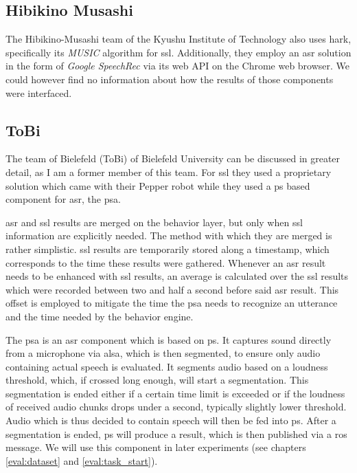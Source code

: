 \subsection{Hibikino Musashi}
The Hibikino-Musashi team of the Kyushu Institute of Technology also uses \gls{hark}, specifically its \textit{MUSIC} algorithm for \gls{ssl}.
Additionally, they employ an \gls{asr} solution in the form of \textit{Google SpeechRec} via its web API on the Chrome web browser.
We could however find no information about how the results of those components were interfaced.

\subsection{ToBi}
The team of Bielefeld (ToBi) of Bielefeld University can be discussed in greater detail, as I am a former member of this team.
For \gls{ssl} they used a proprietary solution which came with their Pepper robot %
while they used a \gls{ps} based component for \gls{asr}, the \gls{psa}. 

\gls{asr} and \gls{ssl} results are merged on the behavior layer, but only when \gls{ssl} information are explicitly needed.
The method with which they are merged is rather simplistic.
\gls{ssl} results are temporarily stored along a timestamp, which corresponds to the time these results were gathered.
Whenever an \gls{asr} result needs to be enhanced with \gls{ssl} results, an average is calculated over the \gls{ssl} results which were recorded between two and half a second before said \gls{asr} result.
This offset is employed to mitigate the time the \gls{psa} needs to recognize an utterance and the time needed by the behavior engine. 

The \gls{psa} is an \gls{asr} component which is based on \gls{ps}. \label{related_work:psa}
It captures sound directly from a microphone via \gls{alsa}, which is then segmented, to ensure only audio containing actual speech is evaluated.
It segments audio based on a loudness threshold, which, if crossed long enough, will start a segmentation.
This segmentation is ended either if a certain time limit is exceeded or if the loudness of received audio chunks drops under a second, typically slightly lower threshold.
Audio which is thus decided to contain speech will then be fed into \gls{ps}.
After a segmentation is ended, \gls{ps} will produce a result, which is then published via a \gls{ros} message.
We will use this component in later experiments (see chapters \ref{eval:dataset} and \ref{eval:task_start}).

